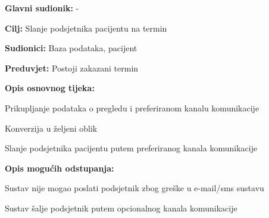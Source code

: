 					\noindent {}
					\begin{packed_item}
	
						\item \textbf{Glavni sudionik: }-
						\item  \textbf{Cilj:} Slanje podsjetnika pacijentu na termin
						\item  \textbf{Sudionici:} Baza podataka, pacijent
						\item  \textbf{Preduvjet:} Postoji zakazani termin
						\item  \textbf{Opis osnovnog tijeka:}
						
						\item[] \begin{packed_enum}
	
							\item Prikupljanje podataka o pregledu i preferiranom kanalu komunikacije
							\item Konverzija u željeni oblik
							\item Slanje podsjetnika pacijentu putem preferiranog kanala komunikacije
						\end{packed_enum}
						
						\item  \textbf{Opis mogućih odstupanja:}
						
						\item[] \begin{packed_item}
	
							\item[2.a] Sustav nije mogao poslati podsjetnik zbog greške u e-mail/sms sustavu
							\item[] \begin{packed_enum}
								
								\item Sustav šalje podsjetnik putem opcionalnog kanala komunikacije
						
							\end{packed_enum}
							
						\end{packed_item}
					\end{packed_item}
					
